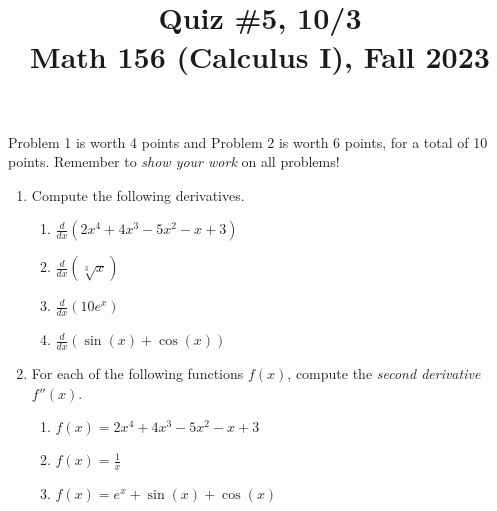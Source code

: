 \documentclass[11pt]{article}
\title{Quiz \#5, 10/3 \\ Math 156 (Calculus I), Fall 2023}
\date{}
\begin{document}
\maketitle

\thispagestyle{empty}

\vspace{-1cm}

Problem 1 is worth 4 points and Problem 2 is worth 6 points, for a total of 10 points. Remember to \emph{show your work} on all problems!

\begin{enumerate}
\item Compute the following derivatives.
\begin{enumerate}
\item $\displaystyle \frac{d}{dx} ( 2x^4 + 4x^3 - 5x^2 - x + 3 )$
\item $\displaystyle \frac{d}{dx} ( \sqrt[3]{x}) $
\item $\displaystyle \frac{d}{dx} ( 10e^{x}) $
\item $\displaystyle \frac{d}{dx} ( \sin(x) + \cos(x) )$
\end{enumerate}

\vspace{2.1in}

\item For each of the following functions $f(x)$, compute the \emph{second derivative} $f''(x)$.
\begin{enumerate}
\item $f(x) = 2x^4 + 4x^3 - 5x^2 - x + 3$
\item $f(x) = \displaystyle \frac{1}{x}$
\item $f(x) = e^x + \sin(x) + \cos(x)$
\end{enumerate}

\end{enumerate}
\end{document}
